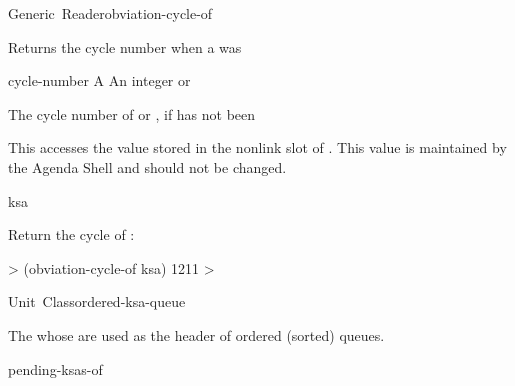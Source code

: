\documentclass[10pt,twoside,english,pdftex]{article}
\begin{document}
\begin{functiondoc}{Generic~Reader}{obviation-cycle-of}{ 
    }
%

\fnsyntax

\fnpurpose Returns the cycle number when a  was 

\fnmethods
{}

\fnpackage {}

\fnmodule {}

\fnargs
\begin{args}{cycle-number}
\arg[ksa] A 
 An integer or \nil{}
\end{args}

\fnreturns The  cycle number of  or \nil,
if  has not been 
  
\fndescription 
This  accesses the value stored in the 
 nonlink slot of .  This value is
maintained by the Agenda Shell and should not be changed.

\begin{alsos}{ksa}
\also[ksa]
\end{alsos}

\fnexample
Return the  cycle of :
%
\W\supp
\begin{example}
  > (obviation-cycle-of ksa)
  1211
  >
\end{example}

\end{functiondoc}


\begin{functiondoc}{Unit~Class}{ordered-ksa-queue}{}
%
%

\fnsyntax

\fnpackage {}

\fnmodule {}

\fndescription The  whose  are used as
the header of ordered (sorted)  queues.

\begin{alsos}{pending-ksas-of}
\also[ksa]
\also[on-queue-p]
\also[queue]
\end{alsos}

\end{functiondoc}
\end{document}
